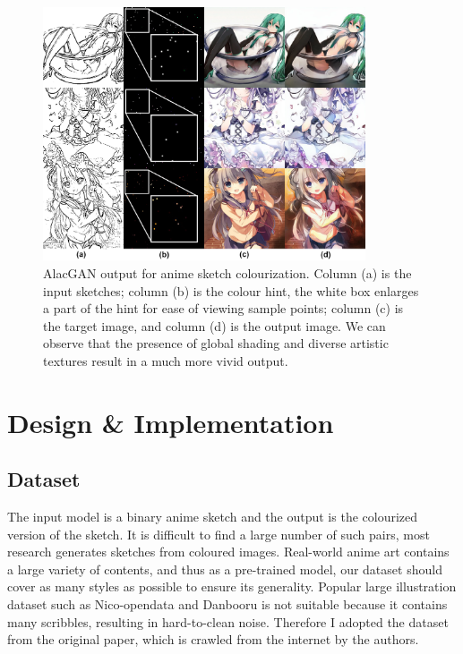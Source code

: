 \begin{figure}
    \centering
    \includegraphics[width=0.85\textwidth]{images/colorization/alacgan.jpg}
    \caption{AlacGAN output for anime sketch colourization. Column (a) is the input sketches; column (b) is the colour hint, the white box enlarges a part of the hint for ease of viewing sample points; column (c) is the target image, and column (d) is the output image. We can observe that the presence of global shading and diverse artistic textures result in a much more vivid output.}
    \label{fig:colorization_alacgan}
\end{figure}

\section{Design \& Implementation}

\subsection{Dataset}
The input model is a binary anime sketch and the output is the colourized version of the sketch. It is difficult to find a large number of such pairs, most research generates sketches from coloured images. Real-world anime art contains a large variety of contents, and thus as a pre-trained model, our dataset should cover as many styles as possible to ensure its generality. Popular large illustration dataset such as Nico-opendata\cite{Undefineda} and Danbooru\cite{branwenDanbooru2021LargeScaleCrowdsourced2015} is not suitable because it contains many scribbles, resulting in hard-to-clean noise. Therefore I adopted the dataset from the original paper, which is crawled from the internet by the authors.

